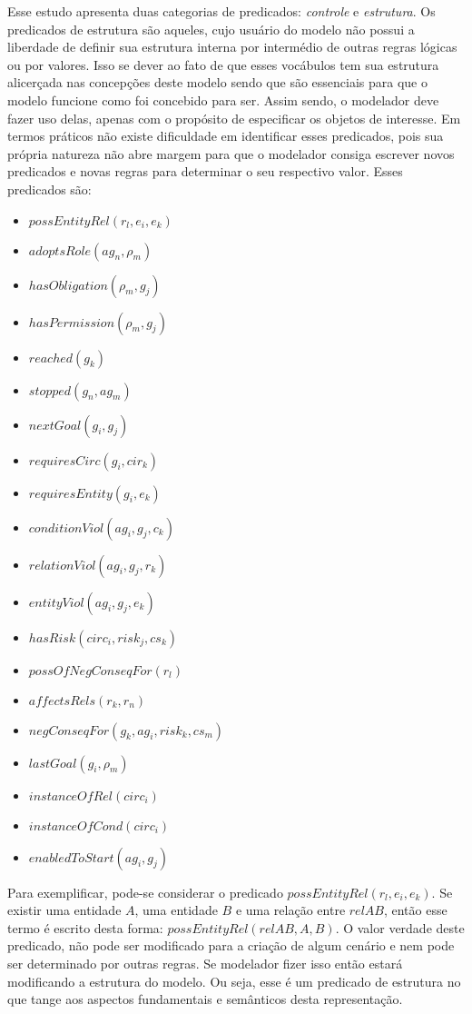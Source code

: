 Esse estudo apresenta duas categorias de predicados: \textit{controle} e \textit{estrutura}. Os predicados de estrutura são aqueles, cujo usuário do modelo não possui a liberdade de definir sua estrutura interna por intermédio de outras regras lógicas ou por valores. Isso se dever ao fato de que esses vocábulos tem sua estrutura alicerçada nas concepções deste modelo sendo que são essenciais para que o modelo funcione como foi concebido para ser. Assim sendo, o modelador deve fazer uso delas, apenas com o propósito de especificar os objetos de interesse. Em termos práticos não existe dificuldade em identificar esses predicados, pois sua própria natureza não abre margem para que o modelador consiga escrever novos predicados e novas regras para determinar o seu respectivo valor. Esses predicados são:

\begin{itemize}
    \item $possEntityRel(r_l,e_i,e_k)$
    \item $adoptsRole(ag_n,\rho_m)$
    \item $hasObligation(\rho_m,g_j)$
    \item $hasPermission(\rho_m, g_j)$
    \item $reached(g_k)$
    \item $stopped(g_n, ag_m)$
    \item $nextGoal(g_i,g_j)$
    \item $requiresCirc(g_i,cir_k)$
    \item $requiresEntity(g_i,e_k)$
    \item $conditionViol(ag_i,g_j,c_k)$
    \item $relationViol(ag_i,g_j,r_k)$
    \item $entityViol(ag_i,g_j,e_k)$
    \item $hasRisk(circ_i, risk_j, cs_k)$
    \item $possOfNegConseqFor(r_l)$
    \item $affectsRels(r_k,r_n)$
    \item $negConseqFor(g_k, ag_i,risk_k,cs_m)$
    \item $lastGoal(g_i,\rho_m)$
    \item $instanceOfRel(circ_i)$
    \item $instanceOfCond(circ_i)$
    \item $enabledToStart(ag_i,g_j)$ 
\end{itemize}

Para exemplificar, pode-se considerar o predicado $possEntityRel(r_l,e_i,e_k)$. Se existir uma entidade $A$, uma entidade $B$ e uma relação entre $relAB$, então esse termo é escrito desta forma: $possEntityRel(relAB,A,B)$. O valor verdade deste predicado, não pode ser modificado para a criação de algum cenário e nem pode ser determinado por outras regras. Se modelador fizer isso então estará modificando a estrutura do modelo. Ou seja, esse é um predicado de estrutura no que tange aos aspectos fundamentais e semânticos desta representação. 

